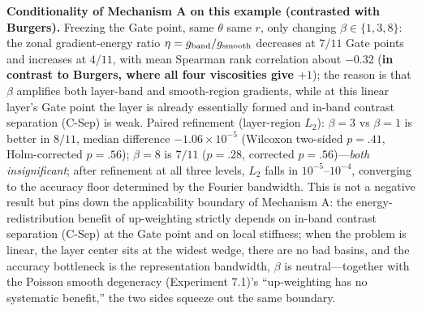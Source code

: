 \documentclass[11pt]{article}
\numberwithin{equation}{section}
\begin{document}
\noindent\textbf{Conditionality of Mechanism A on this example (contrasted with Burgers).} Freezing the Gate point, same $\theta$ same $r$, only changing $\beta\in\{1,3,8\}$: the zonal gradient-energy ratio $\eta=g_{\rm band}/g_{\rm smooth}$ decreases at $7/11$ Gate points and increases at $4/11$, with mean Spearman rank correlation about $-0.32$ (\textbf{in contrast to Burgers, where all four viscosities give $+1$}); the reason is that $\beta$ amplifies both layer-band and smooth-region gradients, while at this linear layer's Gate point the layer is already essentially formed and in-band contrast separation (C-Sep) is weak. Paired refinement (layer-region $L_2$): $\beta=3$ vs $\beta=1$ is better in $8/11$, median difference $-1.06\times10^{-5}$ (Wilcoxon two-sided $p=.41$, Holm-corrected $p=.56$); $\beta=8$ is $7/11$ ($p=.28$, corrected $p=.56$)---\emph{both insignificant}; after refinement at all three levels, $L_2$ falls in $10^{-5}$--$10^{-4}$, converging to the accuracy floor determined by the Fourier bandwidth. This is not a negative result but pins down the applicability boundary of Mechanism A: the energy-redistribution benefit of up-weighting strictly depends on in-band contrast separation (C-Sep) at the Gate point and on local stiffness; when the problem is linear, the layer center sits at the widest wedge, there are no bad basins, and the accuracy bottleneck is the representation bandwidth, $\beta$ is neutral---together with the Poisson smooth degeneracy (Experiment 7.1)'s ``up-weighting has no systematic benefit,'' the two sides squeeze out the same boundary.
\end{document}
